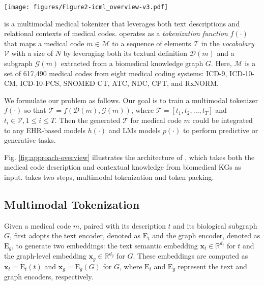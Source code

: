 \begin{figure*}[h!t]
\begin{center}
\centerline{\texttt{[image: figures/Figure2-icml\_overview-v3.pdf]}}
\vspace{-2mm}
\caption{\model is a general multimodal tokenizer of medical codes that can be integrated into any transformer-based model
or a system that requires tokenization. `X-attn' denotes a cross-attention module. }
\label{fig:approach-overview}
\end{center}
\vspace{-5mm}
\end{figure*}

\model is a multimodal medical tokenizer that leverages both text descriptions and relational contexts of medical codes. 
\model operates as a \textit{tokenization function} $f(\cdot)$ that maps a medical code $m \in \mathcal{M}$ to a sequence of elements $\mathcal{T}$ in the \textit{vocabulary} $\mathcal{V}$ with a size of $N$ by leveraging both its textual definition $\mathcal{D}(m)$ and a subgraph $\mathcal{G}(m)$ extracted from a biomedical knowledge graph $G$. Here, $\mathcal{M}$ is a set of 617,490 medical codes from eight medical coding systems: ICD-9, ICD-10-CM, ICD-10-PCS, SNOMED CT, ATC, NDC, CPT, and RxNORM.

We formulate our problem as follows. Our goal is to train a multimodal tokenizer $f(\cdot)$ so that $\mathcal{T} = f(\mathcal{D}(m), \mathcal{G}(m))$, where $\mathcal{T} = [t_1, t_2, ... , t_T]$ and $t_{i} \in \mathcal{V}, 1 \leq i \leq T$. Then the generated $\mathcal{T}$ for medical code $m$ could be integrated to any EHR-based models $h(\cdot)$ and LMs models $p(\cdot)$ to perform predictive or generative tasks.

Fig. \ref{fig:approach-overview} illustrates the architecture of \model, which takes both the medical code description and contextual knowledge from biomedical KGs as input. \model takes two steps, multimodal tokenization and token packing.

\subsection{Multimodal Tokenization}
Given a medical code $m$, paired with its description $t$ and its biological subgraph $G$, \model first adopts the text encoder, denoted as $\mathrm{E}_t$ and the graph encoder, denoted as $\mathrm{E}_g$, to generate two embeddings: the text semantic embedding $\mathbf{x}_{t} \in \mathbb{R}^{d_t}$ for $t$ and the graph-level embedding $\mathbf{x}_{g} \in \mathbb{R}^{d_g}$ for $G$. These embeddings are computed as $\mathbf{x}_{t} = \mathrm{E}_{t}(t)$ and $\mathbf{x}_{g} = \mathrm{E}_{g}(G)$ for $G$, where $\mathrm{E}_{t}$ and $\mathrm{E}_{g}$ represent the text and graph encoders, respectively. 

